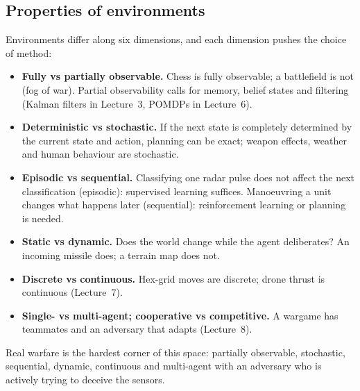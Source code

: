 \documentclass[11pt]{article}
\begin{document}
\subsection{Properties of environments}
Environments differ along six dimensions, and each dimension pushes the choice of method:
\begin{itemize}
\item \textbf{Fully vs partially observable.} Chess is fully observable; a battlefield is not (fog of war). Partial observability calls for memory, belief states and filtering (Kalman filters in Lecture~3, POMDPs in Lecture~6).
\item \textbf{Deterministic vs stochastic.} If the next state is completely determined by the current state and action, planning can be exact; weapon effects, weather and human behaviour are stochastic.
\item \textbf{Episodic vs sequential.} Classifying one radar pulse does not affect the next classification (episodic): supervised learning suffices. Manoeuvring a unit changes what happens later (sequential): reinforcement learning or planning is needed.
\item \textbf{Static vs dynamic.} Does the world change while the agent deliberates? An incoming missile does; a terrain map does not.
\item \textbf{Discrete vs continuous.} Hex-grid moves are discrete; drone thrust is continuous (Lecture~7).
\item \textbf{Single- vs multi-agent; cooperative vs competitive.} A wargame has teammates and an adversary that adapts (Lecture~8).
\end{itemize}
Real warfare is the hardest corner of this space: partially observable, stochastic, sequential, dynamic, continuous and multi-agent with an adversary who is actively trying to deceive the sensors.
\end{document}
